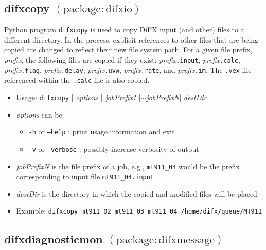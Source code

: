 
\subsection{difxcopy {\small $\mathrm{(package: difxio)}$}} \label{sec:difxcopy}

Python program {\tt difxcopy} is used to copy DiFX input (and other) files to a different directory.
In the process, explicit references to other files that are being copied are changed to reflect their
new file system path.
For a given file prefix, {\em prefix}, the following files are copied if they exist: {\em prefix}{\tt .input}, {\em prefix}{\tt .calc}, {\em prefix}{\tt .flag}, {\em prefix}{\tt .delay}, {\em prefix}{\tt .uvw}, {\em prefix}{\tt .rate}, and {\em prefix}{\tt .im}.
The {\tt .vex} file referenced within the {\tt .calc} file is also copied.

\begin{itemize}
\item[] Usage: {\tt difxcopy} $[$ {\em options} $]$ {\em jobPrefix1} $[\cdots${\em jobPrefixN}$]$ {\em destDir}
\item[] {\em options} can be:
\begin{itemize}
\item[] {\tt -h} or {\tt --help} : print usage information and exit
\item[] {\tt -v} or {\tt --verbose} : possibly increase verbosity of output
\end{itemize}
\item[] {\em jobPrefixN} is the file prefix of a job, e.g., {\tt mt911\_04} would be the prefix corresponding to input file {\tt mt911\_04.input}
\item[] {\em destDir} is the directory in which the copied and modified files will be placed
\item[] Example: {\tt difxcopy mt911\_02 mt911\_03 mt911\_04 /home/difx/queue/MT911}
\end{itemize}











\subsection{difxdiagnosticmon {\small $\mathrm{(package: difxmessage)}$}} \label{sec:difxdiagnosticmon} 

